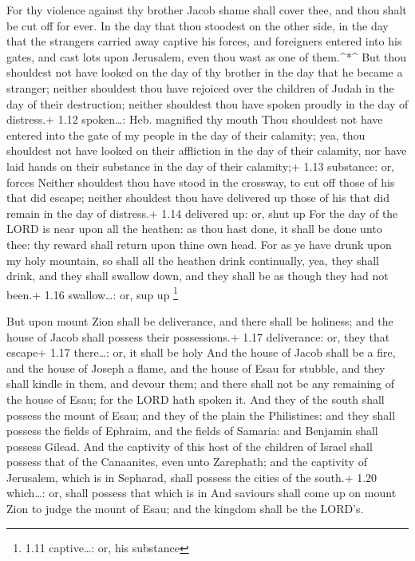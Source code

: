  For thy violence against thy brother Jacob shame shall
cover thee, and thou shalt be cut off for ever.  In the day
that thou stoodest on the other side, in the day that the strangers
carried away captive his forces, and foreigners entered into his gates,
and cast lots upon Jerusalem, even thou wast as one of them.\^{}*\^{}
 But thou shouldest not have looked on the day of thy
brother in the day that he became a stranger; neither shouldest thou
have rejoiced over the children of Judah in the day of their
destruction; neither shouldest thou have spoken proudly in the day of
distress.+ 1.12 spoken\ldots: Heb. magnified thy mouth 
Thou shouldest not have entered into the gate of my people in the day of
their calamity; yea, thou shouldest not have looked on their affliction
in the day of their calamity, nor have laid hands on their substance in
the day of their calamity;+ 1.13 substance: or, forces 
Neither shouldest thou have stood in the crossway, to cut off those of
his that did escape; neither shouldest thou have delivered up those of
his that did remain in the day of distress.+ 1.14 delivered up: or, shut
up  For the day of the LORD is near upon all the heathen:
as thou hast done, it shall be done unto thee: thy reward shall return
upon thine own head.  For as ye have drunk upon my holy
mountain, so shall all the heathen drink continually, yea, they shall
drink, and they shall swallow down, and they shall be as though they had
not been.+ 1.16 swallow\ldots: or, sup up \footnote{1.11 captive\ldots:
  or, his substance}

 But upon mount Zion shall be deliverance, and there shall
be holiness; and the house of Jacob shall possess their possessions.+
1.17 deliverance: or, they that escape+ 1.17 there\ldots: or, it shall
be holy  And the house of Jacob shall be a fire, and the
house of Joseph a flame, and the house of Esau for stubble, and they
shall kindle in them, and devour them; and there shall not be any
remaining of the house of Esau; for the LORD hath spoken it.
 And they of the south shall possess the mount of Esau; and
they of the plain the Philistines: and they shall possess the fields of
Ephraim, and the fields of Samaria: and Benjamin shall possess Gilead.
 And the captivity of this host of the children of Israel
shall possess that of the Canaanites, even unto Zarephath; and the
captivity of Jerusalem, which is in Sepharad, shall possess the cities
of the south.+ 1.20 which\ldots: or, shall possess that which is in
 And saviours shall come up on mount Zion to judge the
mount of Esau; and the kingdom shall be the LORD's.
